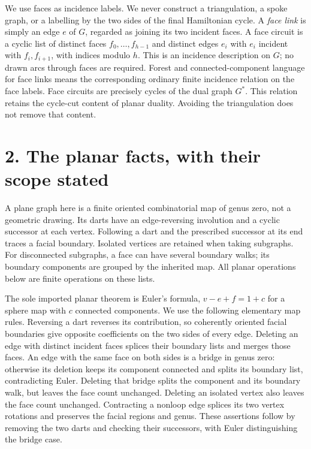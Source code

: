 \documentclass[a4paper,11pt]{amsart}
\begin{document}
We use faces as incidence labels. We never construct a triangulation, a spoke graph, or a labelling by the two sides of the final Hamiltonian cycle. A \emph{face link} is simply an edge $e$ of $G$, regarded as joining its two incident faces. A face circuit is a cyclic list of distinct faces $f_0,\allowbreak \ldots,\allowbreak f_{h-1}$ and distinct edges $e_i$ with $e_i$ incident with $f_i,\allowbreak f_{i+1}$, with indices modulo $h$. This is an incidence description on $G$; no drawn arcs through faces are required. Forest and connected-component language for face links means the corresponding ordinary finite incidence relation on the face labels. Face circuits are precisely cycles of the dual graph $G^*$. This relation retains the cycle-cut content of planar duality. Avoiding the triangulation does not remove that content.

\section*{2. The planar facts, with their scope stated}

A plane graph here is a finite oriented combinatorial map of genus zero, not a geometric drawing. Its darts have an edge-reversing involution and a cyclic successor at each vertex. Following a dart and the prescribed successor at its end traces a facial boundary. Isolated vertices are retained when taking subgraphs. For disconnected subgraphs, a face can have several boundary walks; its boundary components are grouped by the inherited map. All planar operations below are finite operations on these lists.

The sole imported planar theorem is Euler's formula, $v-e+f=1+c$ for a sphere map with $c$ connected components. We use the following elementary map rules. Reversing a dart reverses its contribution, so coherently oriented facial boundaries give opposite coefficients on the two sides of every edge. Deleting an edge with distinct incident faces splices their boundary lists and merges those faces. An edge with the same face on both sides is a bridge in genus zero: otherwise its deletion keeps its component connected and splits its boundary list, contradicting Euler. Deleting that bridge splits the component and its boundary walk, but leaves the face count unchanged. Deleting an isolated vertex also leaves the face count unchanged. Contracting a nonloop edge splices its two vertex rotations and preserves the facial regions and genus. These assertions follow by removing the two darts and checking their successors, with Euler distinguishing the bridge case.
\end{document}
